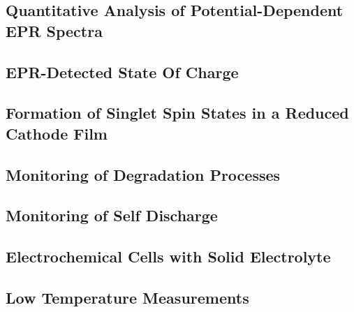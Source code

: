 \subsection{Quantitative Analysis of Potential-Dependent EPR Spectra}

\subsection{EPR-Detected State Of Charge}

\subsection{Formation of Singlet Spin States in a Reduced Cathode Film}

\subsection{Monitoring of Degradation Processes}

\subsection{Monitoring of Self Discharge}

\subsection{Electrochemical Cells with Solid Electrolyte}

\subsection{Low Temperature Measurements}